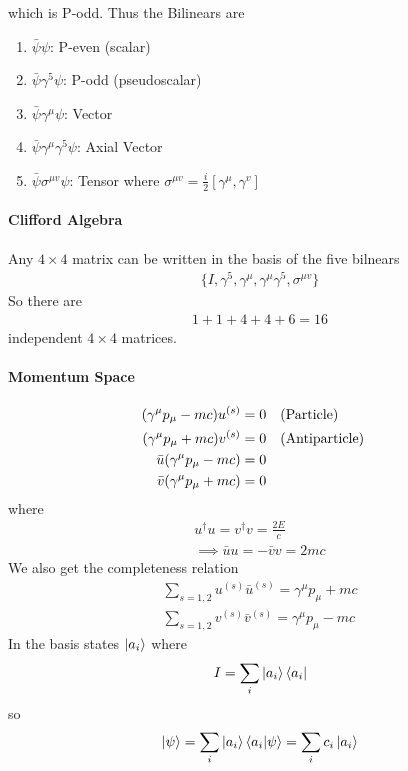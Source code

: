 \documentclass[../main.tex]{subfiles}
\begin{document}
which is P-odd. Thus the Bilinears are
\begin{enumerate}
    \item $\bar \psi \psi$: P-even (scalar)
    \item $\bar \psi \gamma^5 \psi$: P-odd (pseudoscalar)
    \item $\bar \psi \gamma^\mu \psi$: Vector
    \item $\bar \psi \gamma^\mu \gamma^5 \psi$: Axial Vector
    \item $\bar \psi \sigma^{\mu v} \psi$: Tensor where $\sigma^{\mu v} = \frac{i}{2} [\gamma^\mu, \gamma^v]$
\end{enumerate}
\paragraph*{Clifford Algebra}
Any $4\times 4$ matrix can be written in the basis of the five bilnears
\begin{align*}
    \{I, \gamma^5, \gamma^\mu, \gamma^\mu \gamma^5, \sigma^{\mu v}\}
\end{align*}
So there are
\begin{align*}
    1 + 1 + 4 + 4 + 6 = 16
\end{align*}
independent $4\times 4$ matrices.

\paragraph*{Momentum Space}
\begin{align*}
    (\gamma^\mu p_\mu - mc) u^{(s)} &= 0 \qqtext{(Particle)} \\
    (\gamma^\mu p_\mu + mc) v^{(s)} &= 0 \qqtext{(Antiparticle)} \\
    \bar u (\gamma^\mu p_\mu - mc) &= 0  \\
    \bar v (\gamma^\mu p_\mu + mc) &= 0
\end{align*}
where
\begin{align*}
    u^\dagger u = v^\dagger v = \frac{2E}{c} \\
    \implies \bar u u = - \bar v v = 2mc
\end{align*}
We also get the completeness relation
\begin{align*}
    \sum_{s = 1,2} u^{(s)} \bar u^{(s)} = \gamma^\mu p_\mu + mc \\
    \sum_{s = 1,2} v^{(s)} \bar v^{(s)} = \gamma^\mu p_\mu - mc
\end{align*}
In the basis states $\ket{a_i}$ where
\begin{align*}
    I = \sum_i \ket{a_i} \bra{a_i}
\end{align*}
so 
\begin{align*}
    \ket{\psi} = \sum_i \ket{a_i} \braket{a_i}{\psi} = \sum_i c_i \ket{a_i}
\end{align*}
\end{document}
